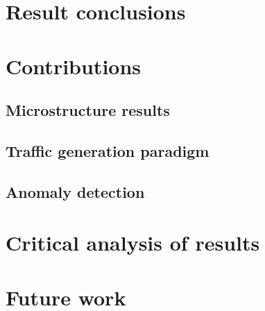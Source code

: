 \section{Result conclusions}

\section{Contributions}

\subsection{Microstructure results}

\subsection{Traffic generation paradigm}

\subsection{Anomaly detection}


\section{Critical analysis of results}

\section{Future work}

